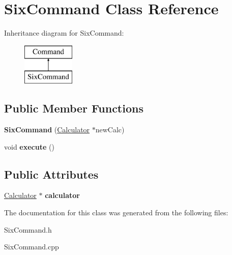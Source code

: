 \hypertarget{class_six_command}{}\section{Six\+Command Class Reference}
\label{class_six_command}
Inheritance diagram for Six\+Command\+:\begin{figure}[H]
\begin{center}
\leavevmode
\includegraphics[height=2.000000cm]{class_six_command}
\end{center}
\end{figure}
\subsection*{Public Member Functions}
\begin{DoxyCompactItemize}
\item 
\hypertarget{class_six_command_aed104b7b3d32d680f6459fc7a124c5a3}{}{\bfseries Six\+Command} (\hyperlink{class_calculator}{Calculator} $\ast$new\+Calc)\label{class_six_command_aed104b7b3d32d680f6459fc7a124c5a3}

\item 
\hypertarget{class_six_command_af34a36bfb4cfd411238144e0afce9d28}{}void {\bfseries execute} ()\label{class_six_command_af34a36bfb4cfd411238144e0afce9d28}

\end{DoxyCompactItemize}
\subsection*{Public Attributes}
\begin{DoxyCompactItemize}
\item 
\hypertarget{class_six_command_aaad9b0fc44a03f98f2de91a140f9a0c2}{}\hyperlink{class_calculator}{Calculator} $\ast$ {\bfseries calculator}\label{class_six_command_aaad9b0fc44a03f98f2de91a140f9a0c2}

\end{DoxyCompactItemize}


The documentation for this class was generated from the following files\+:\begin{DoxyCompactItemize}
\item 
Six\+Command.\+h\item 
Six\+Command.\+cpp\end{DoxyCompactItemize}
